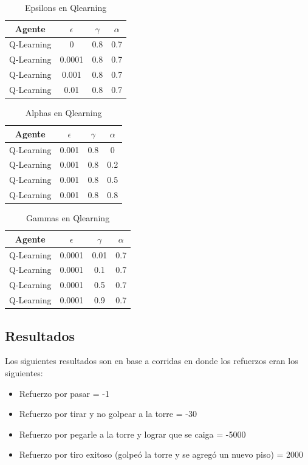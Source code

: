 \documentclass[11pt, a4paper]{article}
\begin{document}
\begin{table}[h!]
\center
\begin{tabular}{ | c | c | c | c | }
  \hline
  Agente & $\epsilon$ & $\gamma$ & $\alpha$ \\
  \hline 
 	 Q-Learning  & 0  & 0.8  & 0.7 \\
	 Q-Learning  & 0.0001  & 0.8  & 0.7 \\
	 Q-Learning  & 0.001  & 0.8  & 0.7 \\
	 Q-Learning  & 0.01  & 0.8  & 0.7 \\
  \hline
\end{tabular}
\caption {Epsilons en Qlearning}
\end{table}

\begin{table}[h!]
\center
\begin{tabular}{ | c | c | c | c | }
  \hline
  Agente & $\epsilon$ & $\gamma$ & $\alpha$ \\
  \hline 
 	 Q-Learning  & 0.001  & 0.8  & 0 \\
	 Q-Learning  & 0.001  & 0.8  & 0.2 \\
	 Q-Learning  & 0.001  & 0.8  & 0.5 \\
	 Q-Learning  & 0.001  & 0.8  & 0.8 \\
  \hline
\end{tabular}
\caption {Alphas en Qlearning}
\end{table}

\begin{table}[h!]
\center
\begin{tabular}{ | c | c | c | c | }
  \hline
  Agente & $\epsilon$ & $\gamma$ & $\alpha$ \\
  \hline 
 	 Q-Learning  & 0.0001  & 0.01  & 0.7 \\
	 Q-Learning  & 0.0001  & 0.1  & 0.7 \\
	 Q-Learning  & 0.0001  & 0.5  & 0.7 \\
	 Q-Learning  & 0.0001  & 0.9  & 0.7 \\
  \hline
\end{tabular}
\caption {Gammas en Qlearning}
\end{table}


\newpage

\subsection{Resultados}

Los siguientes resultados son en base a corridas en donde los refuerzos eran los siguientes:
\begin{itemize}
\item Refuerzo por pasar = -1
\item Refuerzo por tirar y no golpear a la torre = -30
\item Refuerzo por pegarle a la torre y lograr que se caiga = -5000
\item Refuerzo por tiro exitoso (golpe\'o la torre y se agreg\'o un nuevo piso) = 2000
\end{itemize}
\end{document}

